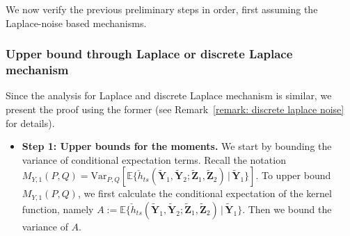 \documentclass[twoside,11pt]{article}
\newcommand{\rvTwo}{Y}
\newcommand{\vectorize}[1]{\mathbf{#1}}
\newcommand{\vecRandomPrivTwoSampleYNumber}[1]{\tilde{\mathbf{Y}}_{#1}}
\newcommand{\mE}{\mathbb{E}} %
\newcommand{\mVPQ}{\mathrm{Var}_{P,Q}} %
\newcommand{\kernelMoment}{M} %
\newcommand{\dataGenDist}{P}  %
\newcommand{\privacyMechanism}{Q}
\newcommand{\momentTwosampleVarCondexpY}{\kernelMoment_{\rvTwo,1}(\dataGenDist, \privacyMechanism)}
\newcommand{\vecRandomPrivTwoSampleZNumber}[1]{\tilde{\mathbf{Z}}_{#1}}
\newcommand{\kernelTwoSampleSym}{\check{h}_{ts}}
\begin{document}
\begin{appendix}
	We now verify the previous preliminary steps in order, first assuming the Laplace-noise based mechanisms.
	
	\subsubsection{Upper bound through Laplace or discrete Laplace mechanism}\label{proof:multinomial_upper_bound_first_moment}
	Since the analysis for Laplace and discrete Laplace mechanism is similar, we present the proof using the former (see Remark~\ref{remark: discrete laplace noise} for details).
	\begin{itemize}
	\item \textbf{Step 1: Upper bounds for the moments.}
	We start by bounding the variance of conditional expectation terms.
	Recall the notation
	$
	\momentTwosampleVarCondexpY
	=
	\mVPQ[\mE\{ \kernelTwoSampleSym(
	\tilde{\vectorize{\rvTwo}}_1,
	\vecRandomPrivTwoSampleYNumber{2}
	;
	\vecRandomPrivTwoSampleZNumber{1},
	\vecRandomPrivTwoSampleZNumber{2}
	)
	\,|\,
	\tilde{\vectorize{\rvTwo}}_1
	\}]$.
	To upper bound $\momentTwosampleVarCondexpY$, we first calculate the conditional expectation of the kernel function, namely
	$A:=\mE\{ \kernelTwoSampleSym(
	\tilde{\vectorize{\rvTwo}}_1,
	\vecRandomPrivTwoSampleYNumber{2}
	;
	\vecRandomPrivTwoSampleZNumber{1},
	\vecRandomPrivTwoSampleZNumber{2}
	)
	\,|\,
	\tilde{\vectorize{\rvTwo}}_1
	\}$.
	Then we  bound the variance of $A$.
	\\
	

\end{itemize}
\end{appendix}
\end{document}
